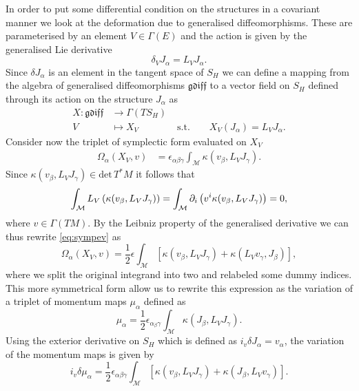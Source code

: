 In order to put some differential condition on the structures in a covariant manner we look at the deformation due to generalised diffeomorphisms. These are parameterised by an element $V\in \Gamma(E)$ and the action is given by the generalised Lie derivative 
\begin{equation}
    \delta_V J_\alpha = L_V J_\alpha. 
\end{equation}
Since $\delta J_\alpha$ is an element in the tangent space of $S_H$ we can define a mapping from the algebra of generalised diffeomorphisms $\mathfrak{gdiff}$ to a vector field on $S_H$ defined through its action on the structure $J_\alpha$ as 
\begin{align}
    X: \mathfrak{gdiff}&\to \Gamma(TS_H)\\
        V&\mapsto X_V \qquad\qquad  \text{s.t.}\qquad X_V(J_\alpha)=L_VJ_\alpha.
\end{align}
Consider now the triplet of symplectic form evaluated on $X_V$
\begin{align}\label{eq:sympev}
    \Omega_\alpha (X_V,v) &= \epsilon_{\alpha\beta\gamma}\int_\mathcal{M}\kappa(v_\beta,L_VJ_\gamma).
\end{align}
Since $\kappa(v_\beta,L_VJ_\gamma) \in \text{det}\, T^{*}M$ it follows that 
\begin{equation}
    \int_\mathcal{M} L_V \left(\kappa(v_\beta,L_VJ_\gamma)\right) = \int_\mathcal{M}\partial_i \left(v^i\kappa(v_\beta,L_VJ_\gamma)\right) = 0,
\end{equation}
where $v\in\Gamma(TM)$. By the Leibniz property of the generalised derivative we can thus rewrite \eqref{eq:sympev} as 
\begin{equation}
    \Omega_\alpha(X_V,v) = \frac{1}{2}\epsilon\int_\mathcal{M}\left[\kappa(v_\beta,L_VJ_\gamma)+\kappa(L_Vv_\gamma,J_\beta)\right],
\end{equation}
where we split the original integrand into two and relabeled some dummy indices. This more symmetrical form allow us to rewrite this expression as the variation of a triplet of momentum maps $\mu_\alpha$ defined as 
\begin{equation}
    \mu_\alpha = \frac{1}{2}\epsilon_{\alpha_\beta\gamma}\int_\mathcal{M}\kappa(J_\beta,L_VJ_\gamma).
\end{equation}
Using the exterior derivative on $S_H$ which is defined as $i_v\delta J_\alpha=v_\alpha$, the variation of the momentum maps is given by 
\begin{equation}
    i_v\delta\mu_\alpha = \frac{1}{2}\epsilon_{\alpha\beta\gamma}\int_{\mathcal{M}}\left[\kappa(v_\beta,L_VJ_\gamma)+\kappa(J_\beta,L_Vv_\gamma)\right].
\end{equation}

